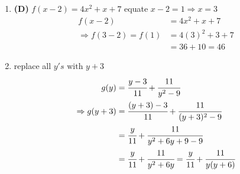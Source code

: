 \begin{multicols}{2}
\begin{enumerate}[label={\textbf{\arabic*.}}]
    \item \textbf{(D)} $f(x - 2) = 4x^2 + x + 7 $ equate $x - 2 = 1 \Rightarrow x = 3$ 
    \begin{align*} 
        f(x - 2) &= 4x^2 + x + 7 \\
        \Rightarrow  f(3 - 2) = f(1) &= 4(3)^2 + 3 + 7 \\
        & = 36 + 10 = 46
    \end{align*}

    \item replace all $y's \text { with } y + 3  $ 
    \begin{align*} 
        g(y) &= \cfrac{y - 3}{11} + \cfrac{11}{y^2 - 9} \\
       \Rightarrow  g(y + 3) &= \cfrac{(y + 3) - 3}{11} + \cfrac{11}{(y + 3)^2 - 9}  \\
        & = \cfrac{y}{11} + \cfrac{11}{y^2 + 6y + 9 -9} \\
        & = \cfrac{y}{11} + \cfrac{11}{y^2 + 6y} = \cfrac{y}{11} + \cfrac{11}{y (y + 6 )}
    \end{align*}


\end{enumerate}
\end{multicols}
